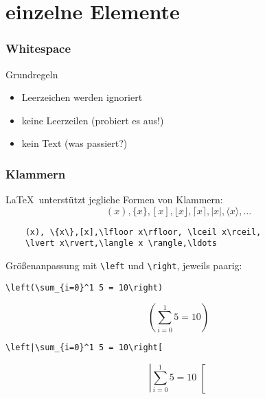 \section{einzelne Elemente}

\begin{frame}[fragile]
  \frametitle {Whitespace}
  \begin{block}{Grundregeln}
    \begin{itemize}
      \item Leerzeichen werden ignoriert
      \item keine Leerzeilen (probiert es aus!)
      \item kein Text (was passiert?)
    \end{itemize}
  \end{block}
\end{frame}
% 

\begin{frame}[fragile]
  \frametitle{Klammern}

  \onslide<+->

  \LaTeX\ unterstützt jegliche Formen von Klammern:
  \begin{equation*}
    (x), \{x\},[x],\lfloor x\rfloor, \lceil x\rceil,\lvert x\rvert,\langle x \rangle,\ldots
  \end{equation*}

  \onslide<+->

  \begin{lstlisting}
    (x), \{x\},[x],\lfloor x\rfloor, \lceil x\rceil,
    \lvert x\rvert,\langle x \rangle,\ldots
  \end{lstlisting}
    
  \medskip

  \onslide<+->

  Größenanpassung mit \lstinline{\left} und \lstinline{\right}, jeweils paarig:

\begin{lstlisting}
\left(\sum_{i=0}^1 5 = 10\right)
\end{lstlisting}

  \vspace*{-2ex}

  \begin{equation*}
    \left(\sum_{i=0}^1 5 = 10\right)
  \end{equation*}

  \vspace*{1ex}

  \onslide<+->

\begin{lstlisting}
\left|\sum_{i=0}^1 5 = 10\right[
\end{lstlisting}

  \vspace*{-2ex}

  \begin{equation*}
    \left|\sum_{i=0}^1 5 = 10\right[
  \end{equation*}

\end{frame}

